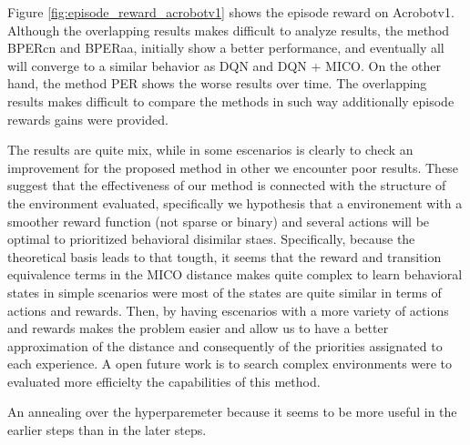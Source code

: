 Figure \ref{fig:episode_reward_acrobotv1} shows the episode reward on Acrobotv1. Although the overlapping results makes difficult to analyze results, the method BPERcn and BPERaa, initially show a better performance, and eventually all will converge to a similar behavior as DQN and DQN + MICO. On the other hand, the method PER shows the worse results over time. The overlapping results makes difficult to compare the methods in such way additionally episode rewards gains were provided.


The results are quite mix, while in some escenarios is clearly to check an improvement for the proposed method in other we encounter poor results. These suggest that the effectiveness of our method is connected with the structure of the environment evaluated, specifically we hypothesis that a environement with a smoother reward function (not sparse or binary) and several actions will be optimal to prioritized behavioral disimilar staes. Specifically, because the theoretical basis leads to that tougth, it seems that the reward and transition equivalence terms in the MICO distance makes quite complex to learn behavioral states in simple scenarios were most of the states are quite similar in terms of actions and rewards. Then, by having escenarios with a more variety of actions and rewards makes the problem easier and allow us to have a better approximation of the distance and consequently of the priorities assignated to each experience. A open future work is to search complex environments were to evaluated more efficielty the capabilities of this method.


An annealing over the hyperparemeter because it seems to be more useful in the earlier steps than in the later steps.

